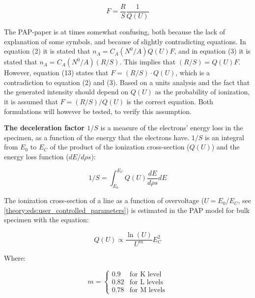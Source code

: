 \begin{equation}
    \label{eq:theory:quantitative:pap:calculation_of_F:F}
    F = \frac{R}{S}   \frac{1}{Q(U)}
\end{equation}

The PAP-paper is at times somewhat confusing, both because the lack of explanation of some symbols, and because of slightly contradicting equations.
In equation (2) it is stated that $n_A = C_A (N^0/A) Q(U) F$, and in equation (3) it is stated that $n_A = C_A (N^0/A) (R/S)$.
This implies that $(R/S) = Q(U) F$.
However, equation (13) states that $F = (R/S) \cdot Q(U)$, which is a contradiction to equation (2) and (3).
Based on a units analysis and the fact that the generated intensity should depend on $Q(U)$ as the probability of ionization, it is assumed that $F = (R/S) / Q(U)$ is the correct equation.
Both formulations will however be tested, to verify this assumption.


\textbf{The deceleration factor $1/S$} is a measure of the electrons' energy loss in the specimen, as a function of the energy that the electrons have.
$1/S$ is an integral from $E_0$ to $E_C$ of the product of the ionization cross-section ($Q(U)$) and the energy loss function ($dE/d\rho s$):

\begin{equation}
    \label{eq:theory:quantitative:pap:calculation_of_F:S}
    1/S = \int_{E_0}^{E_C} Q(U)\frac{dE}{d\rho s} dE
\end{equation}

The ionization cross-section of a line as a function of overvoltage ($U = E_0/E_C$, see \cref{theory:eds:user_controlled_parameters}) is estimated in the PAP model for bulk specimen with the equation:

\begin{equation}
    \label{eq:theory:quantitative:pap:calculation_of_F:ionizationcrosssection}
    Q(U) \propto \frac{\ln(U)}{U^m} E_C^2
\end{equation}

Where:

\begin{equation}
    \label{eq:theory:quantitative:pap:calculation_of_F:ionizationcrosssection:m}
    m = \begin{cases}
        0.9  & \text{for K level}  \\
        0.82 & \text{for L levels} \\
        0.78 & \text{for M levels}
    \end{cases}
\end{equation}


